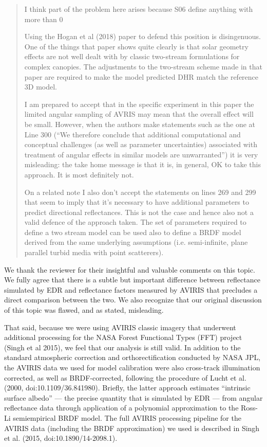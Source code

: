 \begin{quote}
I think part of the problem here arises because S06 define anything with more than 0

Using the Hogan et al (2018) paper to defend this position is disingenuous. One of the things that paper shows quite clearly is that solar geometry effects are not well dealt with by classic two-stream formulations for complex canopies. The adjustments to the two-stream scheme made in that paper are required to make the model predicted DHR match the reference 3D model.

I am prepared to accept that in the specific experiment in this paper the limited angular sampling of AVRIS may mean that the overall effect will be small. However, when the authors make statements such as the one at Line 300 (“We therefore conclude that additional computational and conceptual challenges (as well as parameter uncertainties) associated with treatment of angular effects in similar models are unwarranted”) it is very misleading: the take home message is that it is, in general, OK to take this approach. It is most definitely not.

On a related note I also don’t accept the statements on lines 269 and 299 that seem to imply that it’s necessary to have additional parameters to predict directional reflectances. This is not the case and hence also not a valid defence of the approach taken. The set of parameters required to define a two stream model can be used also to define a BRDF model derived from the same underlying assumptions (i.e. semi-infinite, plane parallel turbid media with point scatterers).
\end{quote}

We thank the reviewer for their insightful and valuable comments on this topic. We fully agree that there is a subtle but important difference between reflectance simulated by EDR and reflectance factors measured by AVIRIS that precludes a direct comparison between the two. We also recognize that our original discussion of this topic was flawed, and as stated, misleading.

That said, because we were using AVIRIS classic imagery that underwent additional processing for the NASA Forest Functional Types (FFT) project (Singh et al 2015), we feel that our analysis is still valid. In addition to the standard atmospheric correction and orthorectification conducted by NASA JPL, the AVIRIS data we used for model calibration were also cross-track illumination corrected, as well as BRDF-corrected, following the procedure of Lucht et al. (2000, doi:10.1109/36.841980). Briefly, the latter approach estimates “intrinsic surface albedo” --- the precise quantity that is simulated by EDR --- from angular reflectance data through application of a polynomial approximation to the Ross-Li semiempirical BRDF model. The full AVIRIS processing pipeline for the  AVIRIS data (including the BRDF approximation) we used is described in Singh et al. (2015, doi:10.1890/14-2098.1).

